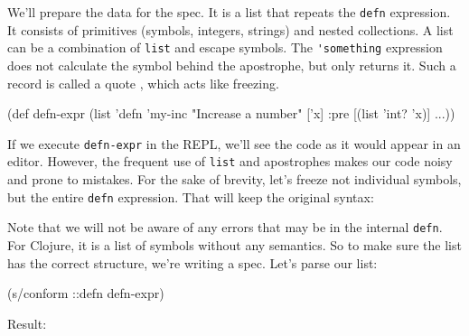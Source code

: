 \fi


We'll prepare the data for the spec. It is a list that repeats the \verb|defn| expression. It consists of primitives (symbols, integers, strings) and nested collections. A list can be a combination of \verb|list| and escape symbols. The \verb|'something| expression does not calculate the symbol behind the apostrophe, but only returns it. Such a record is called a quote , which acts like freezing.

\begin{english}
  \begin{clojure}
(def defn-expr
  (list 'defn 'my-inc
        "Increase a number"
        ['x]
        {:pre [(list 'int? 'x)]} ...))
  \end{clojure}
\end{english}

If we execute \verb|defn-expr| in the REPL, we'll see the code as it would appear in an editor. However, the frequent use of \verb|list| and apostrophes makes our code noisy and prone to mistakes. For the sake of brevity, let's freeze not individual symbols, but the entire \verb|defn| expression. That will keep the original syntax:

\begin{english}
\end{english}

Note that we will not be aware of any errors that may be in the internal \verb|defn|. For Clojure, it is a list of symbols without any semantics. So to make sure the list has the correct structure, we're writing a spec. Let's parse our list:

\begin{english}
  \begin{clojure}
(s/conform ::defn defn-expr)
  \end{clojure}
\end{english}

\noindent
Result:

\ifx\DEVICETYPE\MOBILE

\begin{english}
\end{english}

